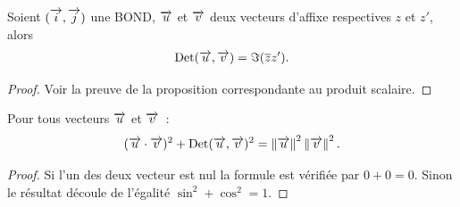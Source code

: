 \begin{prop}
  Soient \((\overrightarrow{i},\overrightarrow{j})\) une BOND, \(\overrightarrow{u}\) et \(\overrightarrow{v}\) deux vecteurs d'affixe respectives \(z\) et \(z'\), alors 
\begin{equation}
  \operatorname{Det}(\overrightarrow{u},\overrightarrow{v})=\Im(\overline{z}z').
\end{equation}
\end{prop}
\begin{proof}
  Voir la preuve de la proposition correspondante au produit scalaire.
\end{proof}
\begin{prop}
  Pour tous vecteurs \(\overrightarrow{u}\) et \(\overrightarrow{v}\)~:
  \begin{equation}
    (\overrightarrow{u} \cdot \overrightarrow{v})^2+\operatorname{Det}(\overrightarrow{u},\overrightarrow{v})^2=\left\lVert\overrightarrow{u}\right\rVert^2 \left\lVert\overrightarrow{v}\right\rVert^2.
  \end{equation}
\end{prop}
\begin{proof}
  Si l'un des deux vecteur est nul la formule est vérifiée par \(0+0=0\). Sinon le résultat découle de l'égalité \(\sin^2+\cos^2=1\).
\end{proof}

